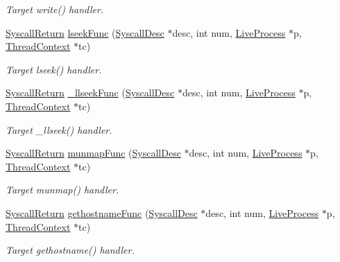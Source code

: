 \begin{DoxyCompactItemize}
\begin{DoxyCompactList}\small\item\em Target write() handler. \item\end{DoxyCompactList}\item 
\hyperlink{classSyscallReturn}{SyscallReturn} \hyperlink{syscall__emul_8hh_aa37fa875550097f17e97de14c6964464}{lseekFunc} (\hyperlink{classSyscallDesc}{SyscallDesc} $\ast$desc, int num, \hyperlink{classLiveProcess}{LiveProcess} $\ast$p, \hyperlink{classThreadContext}{ThreadContext} $\ast$tc)
\begin{DoxyCompactList}\small\item\em Target lseek() handler. \item\end{DoxyCompactList}\item 
\hyperlink{classSyscallReturn}{SyscallReturn} \hyperlink{syscall__emul_8hh_ab86e19440d57fb509cde4f13d38fffda}{\_\-llseekFunc} (\hyperlink{classSyscallDesc}{SyscallDesc} $\ast$desc, int num, \hyperlink{classLiveProcess}{LiveProcess} $\ast$p, \hyperlink{classThreadContext}{ThreadContext} $\ast$tc)
\begin{DoxyCompactList}\small\item\em Target \_\-llseek() handler. \item\end{DoxyCompactList}\item 
\hyperlink{classSyscallReturn}{SyscallReturn} \hyperlink{syscall__emul_8hh_a627dd30ab77faa503107792836ea2158}{munmapFunc} (\hyperlink{classSyscallDesc}{SyscallDesc} $\ast$desc, int num, \hyperlink{classLiveProcess}{LiveProcess} $\ast$p, \hyperlink{classThreadContext}{ThreadContext} $\ast$tc)
\begin{DoxyCompactList}\small\item\em Target munmap() handler. \item\end{DoxyCompactList}\item 
\hyperlink{classSyscallReturn}{SyscallReturn} \hyperlink{syscall__emul_8hh_a82c247bc55c192c038a032fb9bcb884a}{gethostnameFunc} (\hyperlink{classSyscallDesc}{SyscallDesc} $\ast$desc, int num, \hyperlink{classLiveProcess}{LiveProcess} $\ast$p, \hyperlink{classThreadContext}{ThreadContext} $\ast$tc)
\begin{DoxyCompactList}\small\item\em Target gethostname() handler. \item\end{DoxyCompactList}\item 

\end{DoxyCompactItemize}
